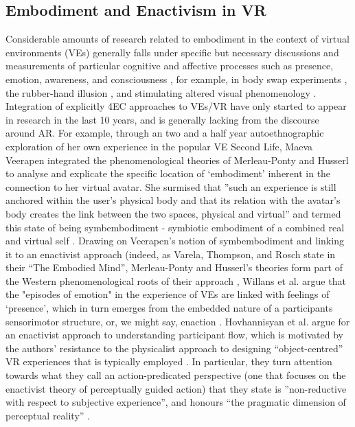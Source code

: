 \subsection{Embodiment and Enactivism in VR}\label{sec: theory-embodimentvr}
Considerable amounts of research related to embodiment in the context of virtual environments (VEs) generally falls under specific but necessary discussions and measurements of particular cognitive and affective processes such as presence, emotion, awareness, and consciousness \citep[]{slater1994,seth2012}, for example, in body swap experiments \citep[]{slater2010}, the rubber-hand illusion \citep[]{suzuki2013}, and stimulating altered visual phenomenology \citep[]{suzuki2017}. Integration of explicitly 4EC approaches to VEs/VR have only started to appear in research in the last 10 years, and is generally lacking from the discourse around AR. For example, through an two and a half year autoethnographic exploration of her own experience in the popular VE Second Life, Maeva Veerapen integrated the phenomenological theories of Merleau-Ponty and Husserl to analyse and explicate the specific location of ‘embodiment’ inherent in the connection to her virtual avatar. She surmised that ”such an experience is still anchored within the user's physical body and that its relation with the avatar's body creates the link between the two spaces, physical and virtual” and termed this state of being symbembodiment - symbiotic embodiment of a combined real and virtual self \citep[]{veerapen2011}. Drawing on Veerapen’s notion of symbembodiment and linking it to an enactivist approach (indeed, as Varela, Thompson, and Rosch state in their “The Embodied Mind”, Merleau-Ponty and Husserl’s theories form part of the Western phenomenological roots of their approach \citeyearpar[pp. 173, 18]{varela1993}, Willans et al. argue that the "episodes of emotion" in the experience of VEs are linked with feelings of ‘presence’, which in turn emerges from the embedded nature of a participants sensorimotor structure, or, we might say, enaction \citeyearpar[p. 23]{willans2016}. Hovhannisyan et al. argue for an enactivist approach to understanding participant flow, which is motivated by the authors’ resistance to the physicalist approach to designing “object-centred”  VR experiences that is typically employed \citeyearpar[p. 1]{hovhannisyan2019}. In particular, they turn attention towards what they call an action-predicated perspective (one that focuses on the enactivist theory of perceptually guided action) that they state is ”non-reductive with respect to subjective experience”, and honours “the pragmatic dimension of perceptual reality” \citeyearpar[p. 18]{hovhannisyan2019}. 

